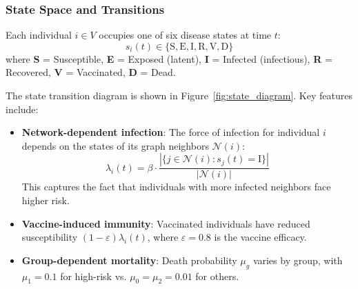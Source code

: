 \subsubsection{State Space and Transitions}

Each individual $i \in V$ occupies one of six disease states at time $t$:
\begin{equation}
s_i(t) \in \{\text{S}, \text{E}, \text{I}, \text{R}, \text{V}, \text{D}\}
\end{equation}
where \textbf{S} = Susceptible, \textbf{E} = Exposed (latent), \textbf{I} = Infected (infectious),
\textbf{R} = Recovered, \textbf{V} = Vaccinated, \textbf{D} = Dead.

The state transition diagram is shown in Figure~\ref{fig:state_diagram}. Key features include:

\begin{itemize}
    \item \textbf{Network-dependent infection}: The force of infection for individual $i$
    depends on the states of its graph neighbors $\mathcal{N}(i)$:
    \begin{equation}
    \lambda_i(t) = \beta \cdot \frac{|\{j \in \mathcal{N}(i) : s_j(t) = \text{I}\}|}{|\mathcal{N}(i)|}
    \end{equation}
    This captures the fact that individuals with more infected neighbors face higher risk.

    \item \textbf{Vaccine-induced immunity}: Vaccinated individuals have reduced susceptibility
    $(1-\varepsilon)\lambda_i(t)$, where $\varepsilon = 0.8$ is the vaccine efficacy.

    \item \textbf{Group-dependent mortality}: Death probability $\mu_g$ varies by group,
    with $\mu_1 = 0.1$ for high-risk vs. $\mu_0 = \mu_2 = 0.01$ for others.
\end{itemize}


